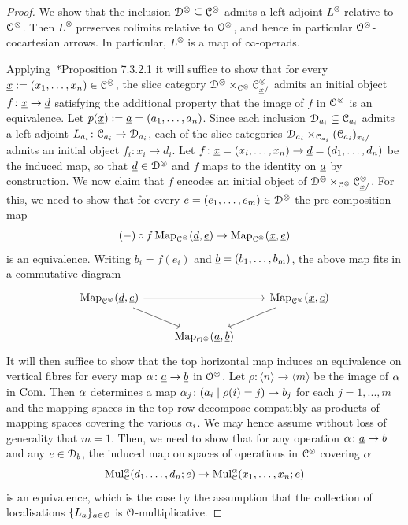 \begin{proof}
We show that the inclusion $\mathcal{D}^{\otimes} \subseteq \mathcal C^{\otimes}$ admits a left adjoint $L^\otimes$ relative to $\mathcal{O}^{\otimes}$. Then $L^\otimes$ preserves colimits relative to $\mathcal{O}^\otimes$, and hence in particular $\mathcal{O}^\otimes$-cocartesian arrows. In particular, $L^\otimes$ is a map of $\infty$-operads.

Applying~\cite{HA}*{Proposition 7.3.2.1} it will suffice to show that for every $\uline{x} := (x_1,\dots,x_n) \in \C^{\otimes}$, the slice category $\D^{\otimes} \times_{\C^{\otimes}} \C^{\otimes}_{\uline{x}/}$ admits an initial object $f\colon \uline{x}\to \uline{d}$ satisfying the additional property that the image of $f$ in $\mathcal{O}^{\otimes}$ is an equivalence. Let $p(\uline{x}) := \uline{a} = (a_1,\dots,a_n)$. Since each inclusion $\mathcal{D}_{a_i} \subseteq \mathcal C_{a_i}$ admits a left adjoint $L_{a_i}\colon \mathcal C_{a_i} \to \mathcal{D}_{a_i}$, each of the slice categories $\mathcal{D}_{a_i} \times_{\mathcal C_{a_i}} (\mathcal C_{a_i})_{x_i/}$ admits an initial object $f_i\colon x_i \to d_i$. Let $f\colon \uline{x}=(x_i,\dots,x_n) \to \uline{d}=(d_1,\dots,d_n)$ be the induced map, so that $\uline{d} \in \D^{\otimes}$ and $f$ maps to the identity on $\uline{a}$ by construction. We now claim that $f$ encodes an initial object of $\D^{\otimes} \times_{\C^{\otimes}} \C^{\otimes}_{\uline{x}/}$. 
For this, we need to show that for every $\uline{e}=(e_1,\dots,e_m) \in \D^{\otimes}$ the pre-composition map
\[
(-) \circ f\Map_{\C^{\otimes}}(\uline{d},\uline{e}) \to \Map_{\C^{\otimes}}(\uline{x},\uline{e})
\]
is an equivalence. Writing $b_i=f(e_i)$ and $\uline{b}=(b_1,\dots,b_m)$, the above map fits in a commutative diagram
\[
\begin{tikzcd}
\Map_{\C^{\otimes}}(\uline{d},\uline{e}) \ar[rr]\ar[dr] && \Map_{\C^{\otimes}}(\uline{x},\uline{e})\ar[dl] \\
&\Map_{\cO^{\otimes}}(\uline{a},\uline{b}) &
\end{tikzcd}
\]
It will then suffice to show that the top horizontal map induces an equivalence on vertical fibres for every map $\alp\colon \uline{a} \to \uline{b}$ in $\mathcal{O}^{\otimes}$. Let $\rho\colon \langle n\rangle \to \langle m\rangle$ be the image of $\alpha$ in $\mathrm{Com}$. Then $\alpha$ determines a map $\alpha_j\colon (a_i \;|\; \rho(i)=j) \to b_j$ for each $j=1,...,m$ and the mapping spaces in the top row decompose compatibly as products of mapping spaces covering the various $\alpha_i$. We may hence assume without loss of generality that $m=1$. Then, we need to show that for any operation 
$\alp\colon \uline{a} \to b$ and any $e \in \mathcal{D}_b$, the induced map on spaces of operations in $\mathcal C^\otimes$ covering $\alpha$
\[
\mathrm{Mul}^{\alpha}_{\mathcal C}(d_1,\dots,d_n;e) \to \mathrm{Mul}^{\alpha}_{\mathcal C}(x_1,\dots,x_n;e)
\]
is an equivalence, which is the case by the assumption that the collection of localisations $\{L_a\}_{a \in \mathcal{O}}$ is $\mathcal{O}$-multiplicative.
\end{proof}

